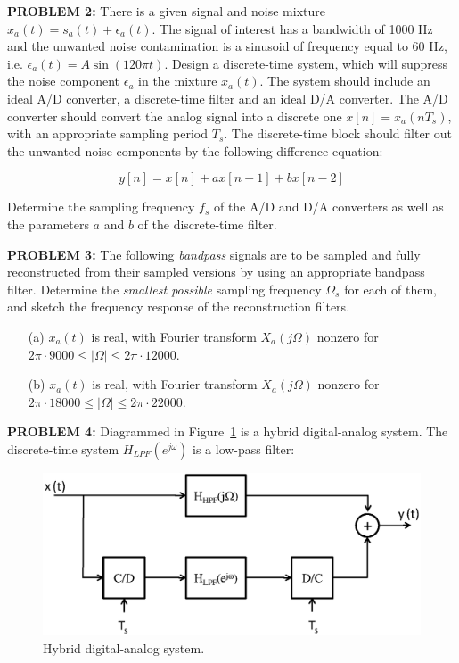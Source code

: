 \documentclass[a4paper,11pt,oneside]{article}
\begin{document}
\vspace{1cm}

\noindent \textbf{PROBLEM 2:} There is a given signal and noise mixture $x_{a}(t)=s_{a}(t)+\epsilon_{a}(t)$. The signal of interest has a bandwidth of 1000 Hz and the unwanted noise contamination is a sinusoid of frequency equal to 60 Hz, i.e. $\epsilon_{a}(t)=A\sin(120\pi t)$. Design a discrete-time system, which will suppress the noise component $\epsilon_{a}$ in the mixture $x_{a}(t)$. The system should include an ideal A/D converter, a discrete-time filter and an ideal D/A converter. The A/D converter should convert the analog signal into a discrete one $x[n]=x_{a}(nT_{s})$, with an appropriate sampling period $T_{s}$. The discrete-time block should filter out the unwanted noise components by the following difference equation:

\[
y[n]=x[n]+ax[n-1]+bx[n-2]
\]

\noindent Determine the sampling frequency $f_{s}$ of the A/D and D/A converters as well as the parameters $a$ and $b$ of the discrete-time filter.

\vspace{1cm}

\noindent \textbf{PROBLEM 3:} The following \emph{bandpass} signals are to be sampled and fully reconstructed from their sampled versions by using an appropriate bandpass filter. Determine the \emph{smallest possible} sampling frequency $\Omega_{s}$ for each of them, and sketch the frequency response of the reconstruction filters. 

\begin{itemize}
\item[(a)] $x_{a}(t)$ is real, with Fourier transform $X_{a}(j\Omega)$ nonzero for $2\pi \cdot 9000 \leq |\Omega| \leq 2\pi \cdot 12000$.
\item[(b)] $x_{a}(t)$ is real, with Fourier transform $X_{a}(j\Omega)$ nonzero for $2\pi \cdot 18000 \leq |\Omega| \leq 2\pi \cdot 22000$.
\end{itemize}


\vspace{1cm}

\noindent \textbf{PROBLEM 4:} Diagrammed in Figure~\ref{fig:fig3} is a hybrid digital-analog system. The discrete-time system $H_{LPF}(e^{j\omega})$ is a low-pass filter:

\begin{figure}[h!]
\centering
\includegraphics[width=\textwidth]{fig3.eps}
\caption{Hybrid digital-analog system.}
\label{fig:fig3}
\end{figure}
\end{document}
